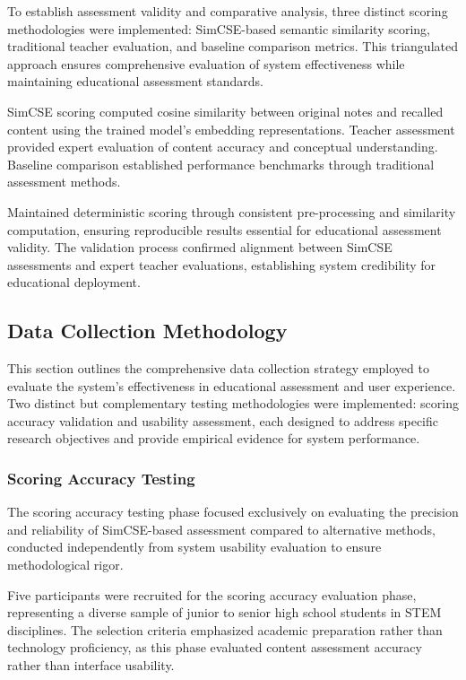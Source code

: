 {To establish assessment validity and comparative analysis, three distinct scoring methodologies were implemented: SimCSE-based semantic similarity scoring, traditional teacher evaluation, and baseline comparison metrics. This triangulated approach ensures comprehensive evaluation of system effectiveness while maintaining educational assessment standards.

SimCSE scoring computed cosine similarity between original notes and recalled content using the trained model's embedding representations. Teacher assessment provided expert evaluation of content accuracy and conceptual understanding. Baseline comparison established performance benchmarks through traditional assessment methods.

Maintained deterministic scoring through consistent pre-processing and similarity computation, ensuring reproducible results essential for educational assessment validity. The validation process confirmed alignment between SimCSE assessments and expert teacher evaluations, establishing system credibility for educational deployment.

\subsection{Data Collection Methodology}

This section outlines the comprehensive data collection strategy employed to evaluate the system's effectiveness in educational assessment and user experience. Two distinct but complementary testing methodologies were implemented: scoring accuracy validation and usability assessment, each designed to address specific research objectives and provide empirical evidence for system performance.

\subsubsection{Scoring Accuracy Testing}

The scoring accuracy testing phase focused exclusively on evaluating the precision and reliability of SimCSE-based assessment compared to alternative methods, conducted independently from system usability evaluation to ensure methodological rigor.

Five participants were recruited for the scoring accuracy evaluation phase, representing a diverse sample of junior to senior high school students in STEM disciplines. The selection criteria emphasized academic preparation rather than technology proficiency, as this phase evaluated content assessment accuracy rather than interface usability.

}
